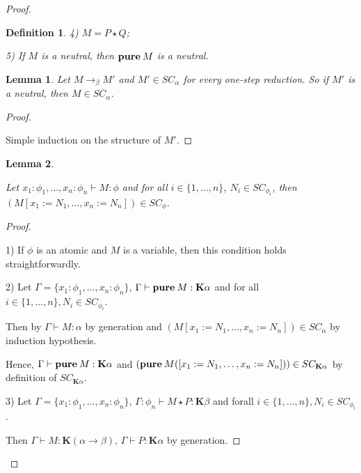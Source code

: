 \documentclass[a4paper]{article}
\newtheorem{lemma}{Lemma}
\newtheorem{defin}{Definition}
\begin{document}
\begin{proof}
\begin{defin}
  4) $M = P \star Q$;

  5) If $M$ is a neutral, then ${\bf pure \: } M$ is a neutral.

  \end{defin}

  \begin{lemma}

  Let $M \rightarrow_{\beta} M'$ and $M' \in SC_{\alpha}$ for every one-step reduction. So if $M'$ is a
  neutral, then $M \in SC_{\alpha}$.

  \end{lemma}

  \begin{proof}

  $ $

  Simple induction on the structure of $M'$.

  \end{proof}

  \begin{lemma}

  $ $

  Let $x_1 : \phi_1, \dots, x_n : \phi_n \vdash M : \phi$ and for all $i \in \{ 1, \dots, n\}$, $N_i
  \in SC_{\phi_i}$, then $(M [x_1 := N_1, \dots, x_n := N_n]) \in SC_{\phi}$.

  \end{lemma}

  \begin{proof}

$ $

  1) If $\phi$ is an atomic and $M$ is a variable, then this condition holds straightforwardly.

  2) Let $\Gamma = \{ x_1 : \phi_1, \dots, x_n : \phi_n \}$, $\Gamma \vdash {\bf pure \: } M :
  \textbf{K}\alpha$ and for all $i \in \{1, \dots, n\}, N_i \in SC_{\phi_i}$.

  Then by $\Gamma \vdash M : \alpha$ by generation
  and $(M [x_1 := N_1, \dots, x_n := N_n]) \in SC_{\alpha}$ by induction hypothesis.

  Hence, $\Gamma \vdash {\bf pure \: } M : \textbf{K}\alpha$ and $({\bf pure \: } M ([x_1 := N_1, \dots, x_n := N_n])) \in SC_{\textbf{K}\alpha}$ by definition of $SC_{\textbf{K}\alpha}$.

  3) Let $\Gamma = \{ x_1 : \phi_1, \dots, x_n : \phi_n \}$, $\Gamma : \phi_n \vdash M \star P : \textbf{K}\beta$ and forall $i \in \{ 1, \dots, n\}, N_i \in SC_{\phi_i}$.

  Then $\Gamma \vdash M : \textbf{K}(\alpha \to \beta)$, $\Gamma \vdash P : \textbf{K}\alpha$ by generation.


\end{proof}
\end{proof}
\end{document}
